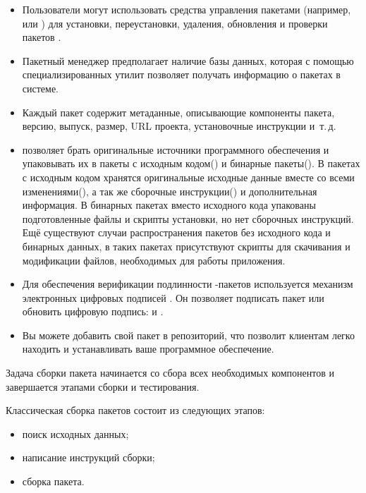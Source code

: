 \begin{itemize}
	\item Пользователи могут использовать средства управления пакетами (например,  или 
		) для установки, переустановки, удаления, обновления и проверки пакетов .
	\item Пакетный менеджер  предполагает наличие базы данных, которая с помощью специализированных 
		утилит позволяет получать информацию о пакетах в системе.
	\item Каждый пакет  содержит метаданные, описывающие компоненты пакета, версию, выпуск, 
		размер, URL проекта, установочные инструкции и~т.\,д.
	\item {} позволяет брать оригинальные источники программного обеспечения и упаковывать их в 
		пакеты с исходным кодом() и бинарные пакеты(). В пакетах с исходным кодом 
		хранятся оригинальные исходные данные вместе со всеми изменениями(), а так же сборочные 
		инструкции() и дополнительная информация. В бинарных пакетах вместо исходного кода 
		упакованы подготовленные файлы и скрипты установки, но нет сборочных инструкций. Ещё существуют 
		случаи распространения пакетов без исходного кода и бинарных данных, в таких пакетах присутствуют 
		скрипты для скачивания и модификации файлов, необходимых для работы приложения.
	\item Для обеспечения верификации подлинности -пакетов используется механизм электронных цифровых 
		подписей . Он позволяет подписать  пакет или обновить цифровую подпись: 
		 и .
	\item Вы можете добавить свой пакет в  репозиторий, что позволит клиентам легко находить и 
		устанавливать ваше программное обеспечение.
\end{itemize}

Задача сборки пакета начинается со сбора всех необходимых компонентов и завершается этапами сборки и тестирования.

Классическая сборка пакетов  состоит из следующих этапов:%

\begin{itemize}
	\item поиск исходных данных;
	\item написание инструкций сборки;
	\item сборка пакета.
\end{itemize}

